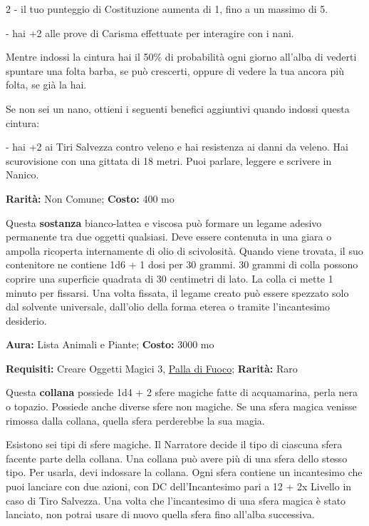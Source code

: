 \begin{multicols}{2}
- il tuo punteggio di Costituzione aumenta di 1, fino a un massimo di 5.

- hai +2 alle prove di Carisma effettuate per interagire con i nani.

Mentre indossi la cintura hai il 50\% di probabilità ogni giorno all'alba di vederti spuntare una folta barba, se può crescerti, oppure di vedere la tua ancora più folta, se già la hai.

Se non sei un nano, ottieni i seguenti benefici aggiuntivi quando indossi questa cintura:

- hai +2 ai Tiri Salvezza contro veleno e hai resistenza ai danni da veleno. Hai scurovisione con una gittata di 18 metri. Puoi parlare, leggere e scrivere in Nanico.


\textbf{Rarità:} Non Comune; \textbf{Costo:} 400 mo

Questa \textbf{sostanza} bianco-lattea e viscosa può formare un legame adesivo permanente tra due oggetti qualsiasi. Deve essere contenuta in una giara o ampolla ricoperta internamente di olio di scivolosità. Quando viene trovata, il suo contenitore ne contiene 1d6 + 1 dosi per 30 grammi. 30 grammi di colla possono coprire una superficie quadrata di 30 centimetri di lato. La colla ci mette 1 minuto per fissarsi. Una volta fissata, il legame creato può essere spezzato solo dal solvente universale, dall'olio della forma eterea o tramite l'incantesimo desiderio.


\textbf{Aura:} Lista Animali e Piante; \textbf{Costo:} 3000 mo

\textbf{Requisiti:} Creare Oggetti Magici 3, \hyperlink{Palla di Fuoco}{Palla di Fuoco}; \textbf{Rarità:} Raro

Questa \textbf{collana} possiede 1d4 + 2 sfere magiche fatte di acquamarina, perla nera o topazio. Possiede anche diverse sfere non magiche. Se una sfera magica venisse rimossa dalla collana, quella sfera perderebbe la sua magia.

Esistono sei tipi di sfere magiche. Il Narratore decide il tipo di ciascuna sfera facente parte della collana. Una collana può avere più di una sfera dello stesso tipo. Per usarla, devi indossare la collana. Ogni sfera contiene un incantesimo che puoi lanciare con due azioni, con DC dell'Incantesimo pari a 12 + 2x Livello in caso di Tiro Salvezza. Una volta che l'incantesimo di una sfera magica è stato lanciato, non potrai usare di nuovo quella sfera fino all'alba successiva.


\end{multicols}
